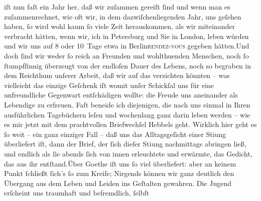 \begin{ledgroupsized}[t]{13cm}
               iſt nun faſt ein Jahr her, daß wir zuſammen gereiſt ſind und wenn man es
               zuſammenrechnet, wie oft wir, in dem dazwiſchenliegenden Jahr, uns geſehen haben, ſo
               wird wohl kaum ſo viele Zeit herauskommen, als wir miteinander verbracht hätten, wenn
               wir, ich in Petersburg und Sie in London, leben würden und wir uns auf 8 oder
               10 Tage etwa in Berlin\textsc{rendez-vous} gegeben hätten.\hspace*{1.5em}Und doch ſind wir weder ſo reich an Freunden und wohlthuenden Menschen, noch ſo
               ſtumpfſinnig überzeugt von der endloſen Dauer des Lebens, noch so begraben in dem
               Reichthum unſerer Arbeit, daß wir auf das verzichten {\pb}könnten – was vielleicht das
               einzige Geſchenk iſt womit unſer Schickſal uns für eine unfreundliche Gegenwart
               entſchädigen wollte: die Freude uns aneinander als Lebendige zu erfreuen.\pend
           \pstart
           Faſt beneide ich diejenigen, die nach uns einmal in Ihren ausführlichen Tagebüchern
               leſen und wochenlang ganz darin leben werden – wie es mir jetzt mit dem prachtvollen
                  Briefwechſel Hebbels geht.\pend
           \pstart
           Wirklich hier geht es ſo weit – ein ganz einziger Fall – daß uns das Alltagsgeſicht
               einer Sti{\geminationm}ung überliefert iſt, dann der Brief, der ſich
               dieſer Sti{\geminationm}ung nachmittags abringen ließ, und endlich
               als ſie abends ſich von innen erleuchtete und erwärmte, das Gedicht, das aus ihr
                  entſtand.\hspace*{1.5em}Über Goethe iſt uns ſo viel überliefert: aber an keinem Punkt ſchließt ſich’s ſo
               zum Kreiſe; Nirgends können wir ganz deutlich den Übergang aus dem Leben und Leiden
               ins Geſtalten gewahren. Die Jugend erſcheint uns traumhaft und befremdlich, ſelbſt

\end{ledgroupsized}

